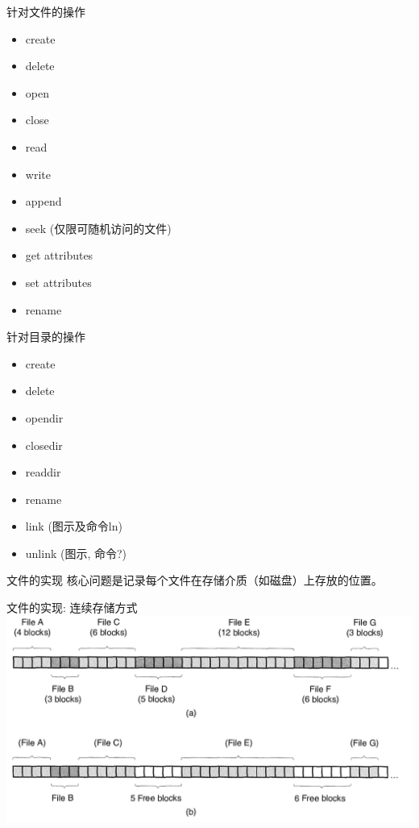 \documentclass[xcolor=svgnames]{beamer}
\begin{document}
\begin{CJK*}{UTF8}{gbsn}
\begin{frame}{针对文件的操作}
\begin{itemize}
\item create
\item delete
\item open
\item close
\item read
\item write
\item append
\item seek (仅限可随机访问的文件)
\item get attributes 
\item set attributes
\item rename
\end{itemize}
\end{frame}

\begin{frame}{针对目录的操作}
\begin{itemize}
\item create
\item delete
\item opendir
\item closedir
\item readdir
\item rename
\item link (图示及命令ln)
\item unlink (图示, 命令?)
\end{itemize}
\end{frame}

\begin{frame}{文件的实现}
\alert{核心问题}是记录每个文件在存储介质（如磁盘）上存放的位置。
\end{frame}

\begin{frame}{文件的实现: 连续存储方式}
\includegraphics[width=1.0\textwidth]{cont.png}
\end{frame}


\end{CJK*}
\end{document}
